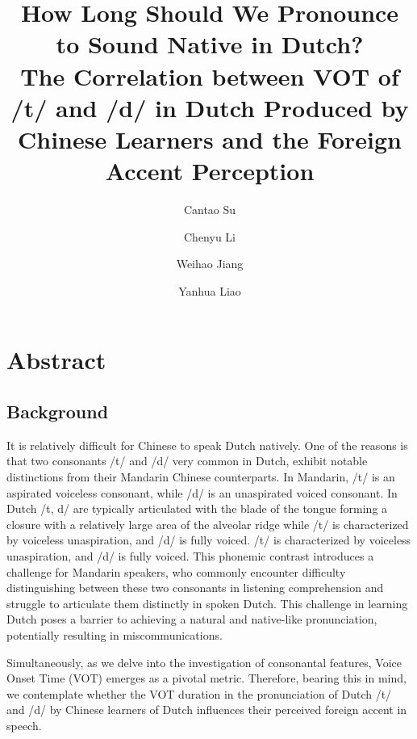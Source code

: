 \documentclass[runningheads]{llncs}
\begin{document}
%
\title{How Long Should We Pronounce to Sound Native in Dutch?\\ The Correlation between VOT of /t/ and /d/ in Dutch Produced by Chinese Learners and the Foreign Accent Perception}
%
%
\author{Cantao Su \and
Chenyu Li \and
Weihao Jiang \and 
Yanhua Liao }
%
%
%
\maketitle              %
%
%
%
\section*{Abstract}
\subsection*{Background}
It is relatively difficult for Chinese to speak Dutch natively. One of the reasons is that two consonants /t/ and /d/ very common in Dutch, exhibit notable distinctions from their Mandarin Chinese counterparts. In Mandarin, /t/ is an aspirated voiceless consonant, while /d/ is an unaspirated voiced consonant. In Dutch /t, d/ are typically articulated with the blade of the tongue forming a closure with a relatively large area of the alveolar ridge while /t/ is characterized by voiceless unaspiration, and /d/ is fully voiced.  /t/ is characterized by voiceless unaspiration, and /d/ is fully voiced. This phonemic contrast introduces a challenge for Mandarin speakers, who commonly encounter difficulty distinguishing between these two consonants in listening comprehension and struggle to articulate them distinctly in spoken Dutch. This challenge in learning Dutch poses a barrier to achieving a natural and native-like pronunciation, potentially resulting in miscommunications.

Simultaneously, as we delve into the investigation of consonantal features, Voice Onset Time (VOT) emerges as a pivotal metric. Therefore, bearing this in mind, we contemplate whether the VOT duration in the pronunciation of Dutch /t/ and /d/ by Chinese learners of Dutch influences their perceived foreign accent in speech.
\end{document}
